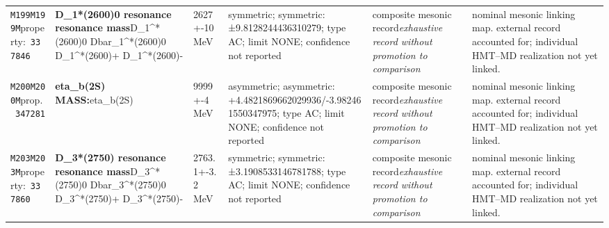 \begin{landscape}
\begin{longtable}{L{1.85cm}L{4.45cm}L{2.35cm}L{4.05cm}L{3.35cm}L{7.15cm}}
\texttt{M199}\newline \texttt{M199M}\newline property:\ \texttt{337846} & \textbf{D\_\allowbreak{}1*(2600)0 resonance resonance mass}\newline D\_\allowbreak{}1\textasciicircum{}*(2600)0 \textbar{}\allowbreak{} Dbar\_\allowbreak{}1\textasciicircum{}*(2600)0 \textbar{}\allowbreak{} D\_\allowbreak{}1\textasciicircum{}*(2600)+ \textbar{}\allowbreak{} D\_\allowbreak{}1\textasciicircum{}*(2600)- & 2627+-10\,MeV & symmetric; symmetric: ±9.8128244436310279; type AC; limit NONE; confidence not reported & composite mesonic record\newline \emph{exhaustive record without promotion to comparison} & nominal mesonic linking map. external record accounted for; individual HMT--MD realization not yet linked. \\
\texttt{M200}\newline \texttt{M200M}\newline prop.\ \texttt{347281} & \textbf{eta\_\allowbreak{}b(2S) MASS:}\newline eta\_\allowbreak{}b(2S) & 9999+-4\,MeV & asymmetric; asymmetric: +4.4821869662029936/-3.982461550347975; type AC; limit NONE; confidence not reported & composite mesonic record\newline \emph{exhaustive record without promotion to comparison} & nominal mesonic linking map. external record accounted for; individual HMT--MD realization not yet linked. \\
\texttt{M203}\newline \texttt{M203M}\newline property:\ \texttt{337860} & \textbf{D\_\allowbreak{}3*(2750) resonance resonance mass}\newline D\_\allowbreak{}3\textasciicircum{}*(2750)0 \textbar{}\allowbreak{} Dbar\_\allowbreak{}3\textasciicircum{}*(2750)0 \textbar{}\allowbreak{} D\_\allowbreak{}3\textasciicircum{}*(2750)+ \textbar{}\allowbreak{} D\_\allowbreak{}3\textasciicircum{}*(2750)- & 2763.1+-3.2\,MeV & symmetric; symmetric: ±3.1908533146781788; type AC; limit NONE; confidence not reported & composite mesonic record\newline \emph{exhaustive record without promotion to comparison} & nominal mesonic linking map. external record accounted for; individual HMT--MD realization not yet linked. \\

\end{longtable}
\end{landscape}
